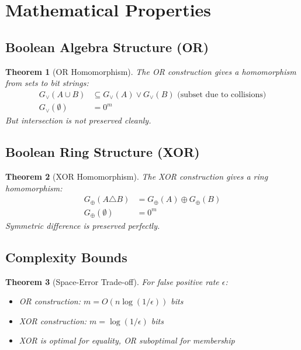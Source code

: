 \documentclass[11pt,final]{article}
\newcommand{\XOR}{\oplus}
\newcommand{\OR}{\lor}
\newtheorem{theorem}{Theorem}[section]
\begin{document}
\section{Mathematical Properties}

\subsection{Boolean Algebra Structure (OR)}

\begin{theorem}[OR Homomorphism]
The OR construction gives a homomorphism from sets to bit strings:
\begin{align}
G_{\OR}(A \cup B) &\subseteq G_{\OR}(A) \lor G_{\OR}(B) \text{ (subset due to collisions)}\\
G_{\OR}(\emptyset) &= 0^m
\end{align}
But intersection is not preserved cleanly.
\end{theorem}

\subsection{Boolean Ring Structure (XOR)}

\begin{theorem}[XOR Homomorphism]
The XOR construction gives a ring homomorphism:
\begin{align}
G_{\XOR}(A \triangle B) &= G_{\XOR}(A) \oplus G_{\XOR}(B)\\
G_{\XOR}(\emptyset) &= 0^m
\end{align}
Symmetric difference is preserved perfectly.
\end{theorem}

\subsection{Complexity Bounds}

\begin{theorem}[Space-Error Trade-off]
For false positive rate $\epsilon$:
\begin{itemize}
    \item OR construction: $m = O(n \log(1/\epsilon))$ bits
    \item XOR construction: $m = \log(1/\epsilon)$ bits
    \item XOR is optimal for equality, OR suboptimal for membership
\end{itemize}
\end{theorem}
\end{document}
